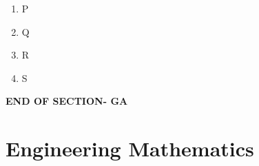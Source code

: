 \documentclass[journal,12pt,onecolumn]{IEEEtran}
\begin{document}
\begin{enumerate}
\begin{multicols}{4}
\begin{enumerate}

\item P

\item Q

\item R

\item S

\end{enumerate}

\end{multicols}

\end{enumerate}

\begin{center}

\item[\textbf{END OF SECTION- GA}]

\end{center}

\newpage
\section*{Engineering Mathematics}

\noindent

\bigskip
\end{document}
